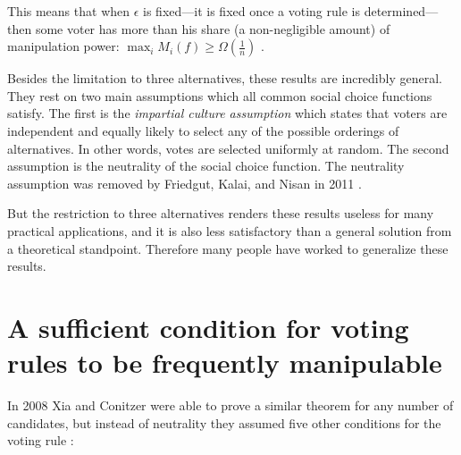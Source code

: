 	This means that when $\epsilon$ is fixed---it is fixed once a voting rule is determined---then some voter has more than his share (a non-negligible amount) of manipulation power: $\max_i M_i(f) \ge \Omega(\frac{1}{n})$ \cite{friedgut2008elections}.

	Besides the limitation to three alternatives, these results are incredibly general. They rest on two main assumptions which all common social choice functions satisfy. The first is the \emph{impartial culture assumption} which states that voters are independent and equally likely to select any of the possible orderings of alternatives. In other words, votes are selected uniformly at random. The second assumption is the neutrality of the social choice function. The neutrality assumption was removed by Friedgut, Kalai, and Nisan in 2011 \cite{friedgut2011quantitative}.

	But the restriction to three alternatives renders these results useless for many practical applications, and it is also less satisfactory than a general solution from a theoretical standpoint. Therefore many people have worked to generalize these results.


\section{A sufficient condition for voting rules to be frequently manipulable}

	In 2008 Xia and Conitzer were able to prove a similar theorem for any number of candidates, but instead of neutrality they assumed five other conditions for the voting rule \cite{xia2008sufficient}:

